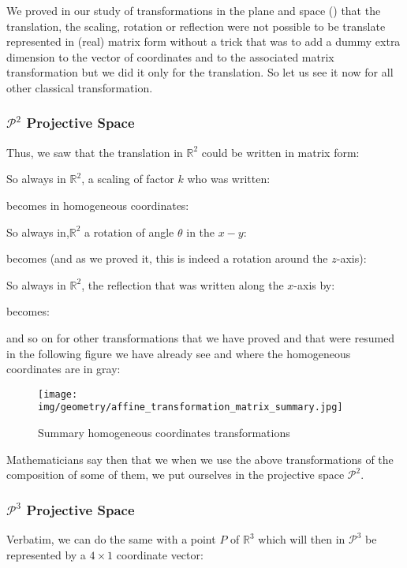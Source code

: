 	We proved in our study of transformations in the plane and space () that the translation, the scaling, rotation or reflection were not possible to be translate represented in (real) matrix form without a trick that was to add a dummy extra dimension to the vector of coordinates and to the associated matrix transformation but we did it only for the translation. So let us see it now for all other classical transformation.
	
	\subsubsection{$\mathcal{P}^2$ Projective Space}
	Thus, we saw that the translation in $\mathbb{R}^2$ could be written in matrix form:
	
	So always in $\mathbb{R}^2$, a scaling of factor $k$ who was written:
	
	becomes in homogeneous coordinates:
	
	So always in,$\mathbb{R}^2$ a rotation of angle $\theta$ in the $x-y$:
	
	becomes (and as we proved it, this is indeed a rotation around the $z$-axis):
	
	So always in $\mathbb{R}^2$, the reflection that was written along the $x$-axis by:
	
	becomes:
	
	and so on for other transformations that we have proved and that were resumed in the following figure we have already see and where the homogeneous coordinates are in gray:
	\begin{figure}[H]
		\centering
		\texttt{[image: img/geometry/affine\_transformation\_matrix\_summary.jpg]}
		\caption{Summary homogeneous coordinates transformations}
	\end{figure}
	Mathematicians say then that we when we use the above transformations of the composition of some of them, we put ourselves in the projective space $\mathcal{P}^2$.
	
	\subsubsection{$\mathcal{P}^3$ Projective Space}
	Verbatim, we can do the same with a point $P$ of $\mathbb{R}^3$ which will then in $\mathcal{P}^3$ be represented by a $4\times 1$ coordinate vector:
	
